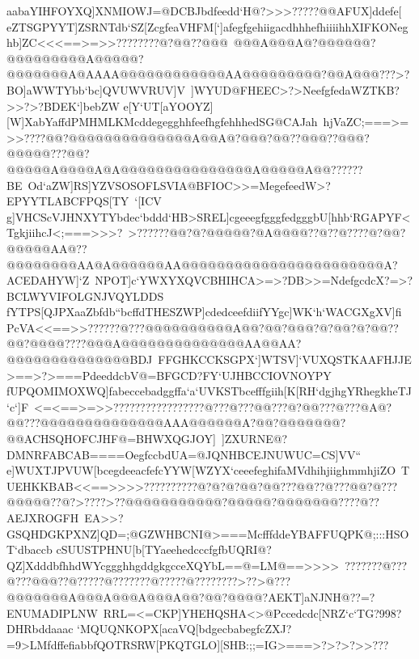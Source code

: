 {{{ aabaYIHFOYXQ]XNMIOWJ=@DCBJbdfeedd`H@?>>>?????@@AFUX]ddefe[}
 \hbox{eZTSGPYYT]ZSRNTdb`SZ[ZcgfeaVHFM[`]afegfgehiigacdhhhefhiiiihhXIFKONeghb]ZC<<<==>=>>????????@?@@??@@@%
 @@@A@@@A@?@@@@@@?@@@@@@@@@A@@@@@?@@@@@@@A@AAAA@@@@@@@@@@@@AA@@@@@@@@@?@@A@@@???>?BO]aWWTYbb`bc]QVUWVRUV]V%
 ]WYUD@FHEEC>?>NeefgfedaWZTKB?>>?>?BDEK`]bebZW}
 \hbox{e[Y`UT[aYOOYZ][W]XabYaffdPMHMLKMcddegegghhfeefhgfehhhedSG@CAJah%
 hjVaZC;===>=>>????@@?@@@@@@@@@@@@@@A@@A@?@@@?@@??@@@??@@@?@@@@@???@@?@@@@@A@@@@A@A@@@@@@@@@@@@@@@A@@@@@A@@??????BE%
 Od`aZW]RS]YZVSOSOFLSVIA@BFIOC>>=MegefeedW>?EPYYTLABCFPQS[TY%
 `[ICV}
 \hbox{g]VHCScVJHNXYTYbdec`bddd`HB>SREL]cgeeegfgggfedgggbU[hhb`RGAPYF<TgkjiihcJ<;===>>>?%
 >??????@@?@?@@@@@?@A@@@@??@??@????@?@@?@@@@@AA@??@@@@@@@@AA@A@@@@@@AA@@@@@@@@@@@@@@@@@@@@@@@A?ACEDAHYW]`Z%
 NPOT]c`YWXYXQVCBHIHCA>=>?DB>>=NdefgcdcX?=>?BCLWYVIFOLGNJVQYLDDS}
 \hbox{fYTPS[QJPXaaZbfdb``bcffdTHESZWP]cdedceefdiifYYgc]WK`h`WACGXgXV]fi%
 PcVA<<==>>??????@???@@@@@@@@@@A@@?@@?@@@?@?@@?@?@@??@@?@@@@????@@@A@@@@@@@@@@@@@@AA@@AA?@@@@@@@@@@@@@@BDJ%
 FFGHKCCKSGPX`]WTSV]`VUXQSTKAAFHJJE>==>?>===PdeeddcbV@=BFGCD?FY`UJHBCCIOVNOYPY}
 \hbox{fUPQOMIMOXWQ]fabeccebadggffa`a`UVKSTbcefffgiih[K[RH`dgjhgYRhegkheTJ`c`]F%
 <=<==>=>>?????????????????@???@???@@???@?@@???@???@A@?@@???@@@@@@@@@@@@@@AAA@@@@@@A?@@?@@@@@@@?@@ACHSQHOFCJHF@=BHWXQGJOY]%
 ]ZXURNE@?DMNRFABCAB====OegfccbdUA=@JQNHBCEJNUWUC=CS]VV``}
 \hbox{e]WUXTJPVUW[bcegdeeacfefcYYW[WZYX`ceeefeghifaMVdhihjiighmmhjiZO%
 TUEHKKBAB<<==>>>>??????????@?@?@?@@?@@???@@??@???@@?@???@@@@@??@?>????>??@@@@@@@@@@@?@@@@@?@@@@@@@????@??AEJXROGFH%
 EA>>?GSQHDGKPXNZ]QD=;@GZWHBCNI@>===McfffddeYBAFFUQPK@;:::HSOT`dbaccb}
 \hbox{cSUUSTPHNU[b[TYaeehedcccfgfbUQRI@?QZ]XdddbfhhdWYcggghhgddgkgcceXQYbL==@=LM@==>>>>%
 ???????@???@???@@@??@?????@???????@?????@????????>??>@???@@@@@@@A@@@A@@@A@@@A@@?@@?@@@@?AEKT]aNJNH@??=?ENUMADIPLNW%
 RRL=<=CKP]YHEHQSHA<>@Pccedcdc[NRZ`c`TG?998?DHRbddaaac}
 \hbox{`MQUQNKOPX[acaVQ[bdgecbabegfcZXJ?=9>LMfdffefiabbfQOTRSRW[PKQTGLO][SHB:;;=IG>===>?>?>?>>???%
}}}
